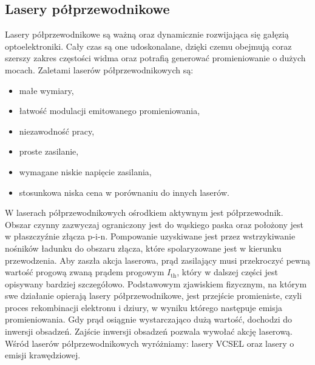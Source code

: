 \subsection{Lasery półprzewodnikowe}
Lasery półprzewodnikowe są ważną oraz dynamicznie rozwijająca się gałęzią optoelektroniki. Cały czas są one udoskonalane,
dzięki czemu obejmują coraz szerszy zakres częstości widma oraz potrafią generować promieniowanie o dużych mocach.
Zaletami laserów półprzewodnikowych są:
\begin{itemize}
\item małe wymiary,
\item łatwość modulacji emitowanego promieniowania,
\item niezawodność pracy,
\item proste zasilanie,
\item wymagane niskie napięcie zasilania,
\item stosunkowa niska cena w porównaniu do innych laserów.
\end{itemize}
W laserach półprzewodnikowych ośrodkiem aktywnym jest półprzewodnik.
Obszar czynny zazwyczaj ograniczony jest do wąskiego paska oraz położony jest w płaszczyźnie złącza p-i-n.
Pompowanie uzyskiwane jest przez wstrzykiwanie nośników ładunku do obszaru złącza, które spolaryzowane jest w kierunku przewodzenia.
Aby zaszła akcja laserowa, prąd zasilający musi przekroczyć pewną wartość progową zwaną prądem progowym $I_{\mathrm{th}}$, który w dalszej części jest
opisywany bardziej szczegółowo.
Podstawowym zjawiskiem fizycznym, na którym swe działanie opierają lasery półprzewodnikowe, jest przejście promieniste,
czyli proces rekombinacji elektronu i dziury, w wyniku którego następuje emisja promieniowania. Gdy prąd osiągnie wystarczająco
dużą wartość, dochodzi do inwersji obsadzeń.
Zajście inwersji obsadzeń pozwala wywołać akcję laserową. Wśród laserów półprzewodnikowych wyróżniamy:
lasery VCSEL oraz lasery o emisji krawędziowej.
